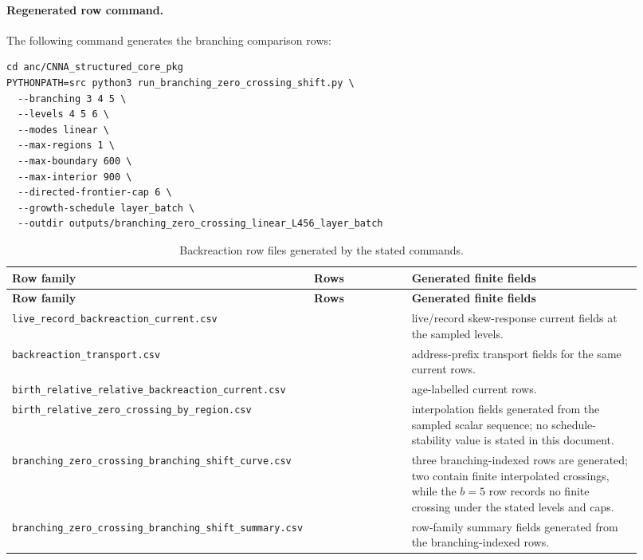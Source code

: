 \documentclass[11pt]{article}
\theoremstyle{remark}
\newcommand{\code}[1]{\texttt{#1}}
\numberwithin{equation}{section}
\begin{document}
\paragraph{Regenerated row command.}
The following command generates the branching comparison rows:
\begin{verbatim}
cd anc/CNNA_structured_core_pkg
PYTHONPATH=src python3 run_branching_zero_crossing_shift.py \
  --branching 3 4 5 \
  --levels 4 5 6 \
  --modes linear \
  --max-regions 1 \
  --max-boundary 600 \
  --max-interior 900 \
  --directed-frontier-cap 6 \
  --growth-schedule layer_batch \
  --outdir outputs/branching_zero_crossing_linear_L456_layer_batch
\end{verbatim}


\begin{longtable}{>{\raggedright\arraybackslash}p{0.38\linewidth}>{\raggedleft\arraybackslash}p{0.16\linewidth}>{\raggedright\arraybackslash}p{0.38\linewidth}}
\caption{Backreaction row files generated by the stated commands.}\label{tab:backreaction-generated-row-files}\\
\toprule
\textbf{Row family} & \textbf{Rows} & \textbf{Generated finite fields}\\
\midrule
\endfirsthead
\toprule
\textbf{Row family} & \textbf{Rows} & \textbf{Generated finite fields}\\
\midrule
\endhead
\code{live\_record\_backreaction\_current.csv} & 3 & live/record skew-response current fields at the sampled levels.\\
\hline
\code{backreaction\_transport.csv} & 9 & address-prefix transport fields for the same current rows.\\
\hline
\code{birth\_relative\_relative\_}\allowbreak{}\code{backreaction\_current.csv} & 3 & age-labelled current rows.\\
\hline
\code{birth\_relative\_zero\_crossing\_by\_region.csv} & 1 & interpolation fields generated from the sampled scalar sequence; no schedule-stability value is stated in this document.\\
\hline
\code{branching\_zero\_crossing\_}\allowbreak{}\code{branching\_shift\_curve.csv} & 3 & three branching-indexed rows are generated; two contain finite interpolated crossings, while the \(b=5\) row records no finite crossing under the stated levels and caps.\\
\hline
\code{branching\_zero\_crossing\_}\allowbreak{}\code{branching\_shift\_summary.csv} & 1 & row-family summary fields generated from the branching-indexed rows.\\
\bottomrule
\end{longtable}
\end{document}
